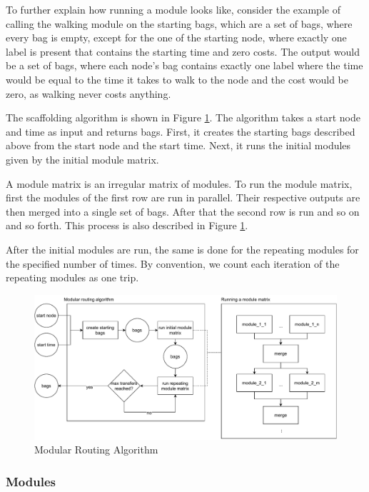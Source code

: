 To further explain how running a module looks like, consider the example of calling the walking module on the starting bags, which are a set of bags, where every bag is empty, except for the one of the starting node, where exactly one label is present that contains the starting time and zero costs.
The output would be a set of bags, where each node's bag contains exactly one label where the time would be equal to the time it takes to walk to the node and the cost would be zero, as walking never costs anything.

The scaffolding algorithm is shown in Figure \ref{fig:modular_routing_algorithm}.
The algorithm takes a start node and time as input and returns bags.
First, it creates the starting bags described above from the start node and the start time.
Next, it runs the initial modules given by the initial module matrix.

A module matrix is an irregular matrix of modules.
To run the module matrix, first the modules of the first row are run in parallel.
Their respective outputs are then merged into a single set of bags.
After that the second row is run and so on and so forth.
This process is also described in Figure \ref{fig:modular_routing_algorithm}.

After the initial modules are run, the same is done for the repeating modules for the specified number of times.
By convention, we count each iteration of the repeating modules as one trip.

\begin{figure}
    \centering
    \includegraphics[scale=0.40]{Figures/method/modular_routing_algorithm}
    \caption{Modular Routing Algorithm}
    \label{fig:modular_routing_algorithm}
\end{figure}


\subsubsection{Modules}
\label{subsubsec:modules}

